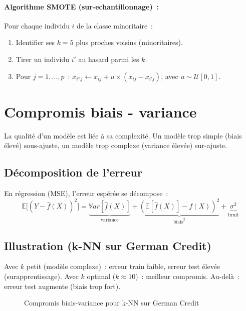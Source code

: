 \documentclass[a4paper,11pt]{article}
\theoremstyle{definition}
\theoremstyle{remark}
\begin{document}
\paragraph{Algorithme SMOTE (sur-echantillonnage)~:}
Pour chaque individu $i$ de la classe minoritaire~:
\begin{enumerate}
  \item Identifier ses $k=5$ plus proches voisins (minoritaires).
  \item Tirer un individu $i'$ au hasard parmi les $k$.
  \item Pour $j = 1,\dots,p$~:
    $x_{i''j} \leftarrow x_{ij} + u \times (x_{ij} - x_{i'j})$,
    avec $u \sim \mathcal{U}[0,1]$.
\end{enumerate}

\section{Compromis biais - variance}

La qualit\'e d'un mod\`ele est li\'ee \`a sa complexit\'e.
Un mod\`ele trop simple (biais \'elev\'e) sous-ajuste, un mod\`ele
trop complexe (variance \'elev\'ee) sur-ajuste.

\subsection{D\'ecomposition de l'erreur}

En r\'egression (MSE), l'erreur esp\'er\'ee se d\'ecompose~:
\[
\mathbb{E}\big[ (Y - \hat{f}(X))^2 \big] =
\underbrace{\mathbb{V}ar[\hat{f}(X)]}_{\text{variance}}
+ \underbrace{(\mathbb{E}[\hat{f}(X)] - f(X))^2}_{\text{biais}^2}
+ \underbrace{\sigma^2}_{\text{bruit}}
\]

\subsection{Illustration (k-NN sur German Credit)}

Avec $k$ petit (mod\`ele complexe)~: erreur train faible,
erreur test \'elev\'ee (surapprentissage).
Avec $k$ optimal ($k\approx10$)~: meilleur compromis.
Au-del\`a~: erreur test augmente (biais trop fort).

\begin{figure}[h]
\centering
{}
\caption{Compromis biais-variance pour k-NN sur German Credit}
\end{figure}
\end{document}
